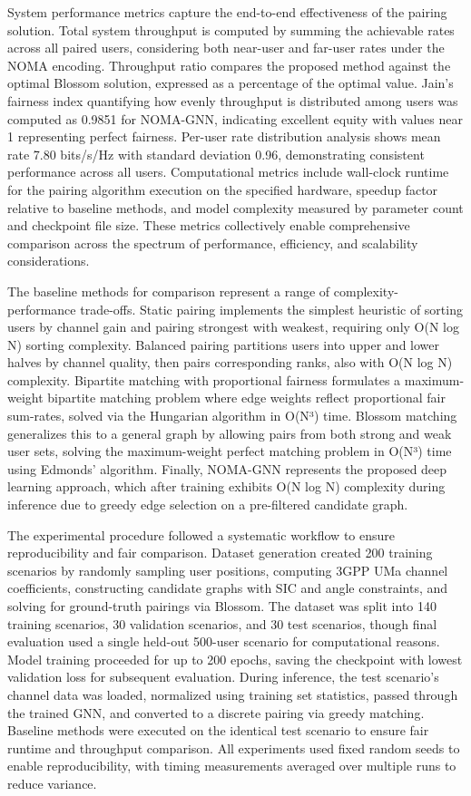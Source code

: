 System performance metrics capture the end-to-end effectiveness of the pairing solution. Total system throughput is computed by summing the achievable rates across all paired users, considering both near-user and far-user rates under the NOMA encoding. Throughput ratio compares the proposed method against the optimal Blossom solution, expressed as a percentage of the optimal value. Jain's fairness index quantifying how evenly throughput is distributed among users was computed as 0.9851 for NOMA-GNN, indicating excellent equity with values near 1 representing perfect fairness. Per-user rate distribution analysis shows mean rate 7.80 bits/s/Hz with standard deviation 0.96, demonstrating consistent performance across all users. Computational metrics include wall-clock runtime for the pairing algorithm execution on the specified hardware, speedup factor relative to baseline methods, and model complexity measured by parameter count and checkpoint file size. These metrics collectively enable comprehensive comparison across the spectrum of performance, efficiency, and scalability considerations.

The baseline methods for comparison represent a range of complexity-performance trade-offs. Static pairing implements the simplest heuristic of sorting users by channel gain and pairing strongest with weakest, requiring only O(N log N) sorting complexity. Balanced pairing partitions users into upper and lower halves by channel quality, then pairs corresponding ranks, also with O(N log N) complexity. Bipartite matching with proportional fairness formulates a maximum-weight bipartite matching problem where edge weights reflect proportional fair sum-rates, solved via the Hungarian algorithm in O(N³) time. Blossom matching generalizes this to a general graph by allowing pairs from both strong and weak user sets, solving the maximum-weight perfect matching problem in O(N³) time using Edmonds' algorithm. Finally, NOMA-GNN represents the proposed deep learning approach, which after training exhibits O(N log N) complexity during inference due to greedy edge selection on a pre-filtered candidate graph.

The experimental procedure followed a systematic workflow to ensure reproducibility and fair comparison. Dataset generation created 200 training scenarios by randomly sampling user positions, computing 3GPP UMa channel coefficients, constructing candidate graphs with SIC and angle constraints, and solving for ground-truth pairings via Blossom. The dataset was split into 140 training scenarios, 30 validation scenarios, and 30 test scenarios, though final evaluation used a single held-out 500-user scenario for computational reasons. Model training proceeded for up to 200 epochs, saving the checkpoint with lowest validation loss for subsequent evaluation. During inference, the test scenario's channel data was loaded, normalized using training set statistics, passed through the trained GNN, and converted to a discrete pairing via greedy matching. Baseline methods were executed on the identical test scenario to ensure fair runtime and throughput comparison. All experiments used fixed random seeds to enable reproducibility, with timing measurements averaged over multiple runs to reduce variance.


